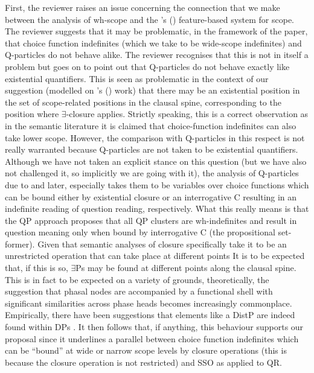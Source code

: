 \documentclass[11pt]{article}
\newcommand{\citeposs}[1]{\citeauthor{#1}'s (\citeyear{#1})}
\begin{document}
First, the reviewer raises an issue concerning the connection that we make between the analysis of wh-scope and the \citeposs{Beghelli-Stowell97} feature-based system for scope.  The reviewer suggests that it may be problematic, in the framework of the paper, that choice function indefinites (which we take to be wide-scope indefinites) and Q-particles do not behave alike.  The reviewer recognises that this is not in itself a problem but goes on to point out that  Q-particles do not behave exactly like  existential quantifiers. This is seen as problematic in the context of our suggestion (modelled on \citeposs{kratzer:05} work) that there may be an existential position in the set of scope-related positions in the clausal spine, corresponding to the position where $\exists$-closure applies. Strictly speaking, this is a correct observation as in the semantic literature it is claimed that choice-function indefinites can also take lower scope. However, the comparison with Q-particles in this respect is not really warranted because Q-particles are not taken to be existential quantifiers.  Although we have not taken an explicit stance on this question (but we have also not challenged it, so implicitly we are going with it), the analysis of Q-particles due to \citet{hagstrom:1998} and later, especially \citet{cable:2007} takes them to be variables over choice functions which can be bound either by existential closure or an interrogative C resulting in an indefinite reading of question reading, respectively. What this really means is that the QP approach proposes that all QP clusters are wh-indefinites and result in question meaning only when bound by interrogative C (the propositional set-former). Given that semantic analyses of closure specifically take it to be an unrestricted operation that can take place at different points \citep[see most importantly,][and subsequent work]{Reinhart:1997,winter:1997a}  It is to be expected that, if this is so, $\exists$Ps may be found at different points along the clausal spine. This is in fact to be expected on a variety of grounds, theoretically, the suggestion that phasal nodes are accompanied by a functional shell with significant similarities across phase heads becomes increasingly commonplace.  Empirically, there have been suggestions that elements like a DistP are indeed found within DPs \citep[e.g.][]{etxepare:14,tsoulas-woods:15}. It then follows that, if anything, this behaviour supports our proposal since it underlines a parallel between choice function indefinites which can be ``bound'' at wide or narrow scope levels by closure operations (this is because the closure operation is not restricted) and SSO as applied to QR.
\end{document}
